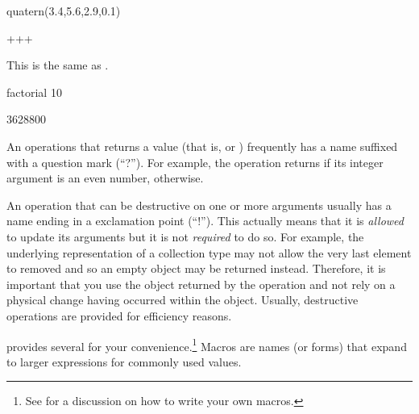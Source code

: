 {{{{{{{{\begin{xtc}
\begin{spadsrc}
quatern(3.4,5.6,2.9,0.1)
\end{spadsrc}
\begin{TeXOutput}
\begin{fricasmath}{3}
+\TIMES {}+\TIMES {}+%
\TIMES {}%
\end{fricasmath}
\end{TeXOutput}
\end{xtc}
\begin{xtc}
\begin{xtccomment}
This is the same as .
\end{xtccomment}
\begin{spadsrc}
factorial 10
\end{spadsrc}
\begin{TeXOutput}
\begin{fricasmath}{4}
3628800%
\end{fricasmath}
\end{TeXOutput}
\end{xtc}

An operations that returns a  value (that is,
 or ) frequently has a name suffixed with
a question mark (``?'').  For example, the 
operation returns  if its integer argument is an even
number,  otherwise.

An operation that can be destructive on one or more arguments
usually has a name ending in a exclamation point (``!'').
This actually means that it is {\it allowed} to update its
arguments but it is not {\it required} to do so. For example,
the underlying representation of a collection type may not allow
the very last element to removed and so an empty object may be
returned instead. Therefore, it is important that you use the
object returned by the operation and not rely on a physical
change having occurred within the object. Usually, destructive
operations are provided for efficiency reasons.


\Language{} provides several 
for your convenience.\footnote{See 
for a discussion on how to write your own macros.}
Macros are names
(or forms) that expand to larger expressions for commonly used values.

}}}}}}}}
